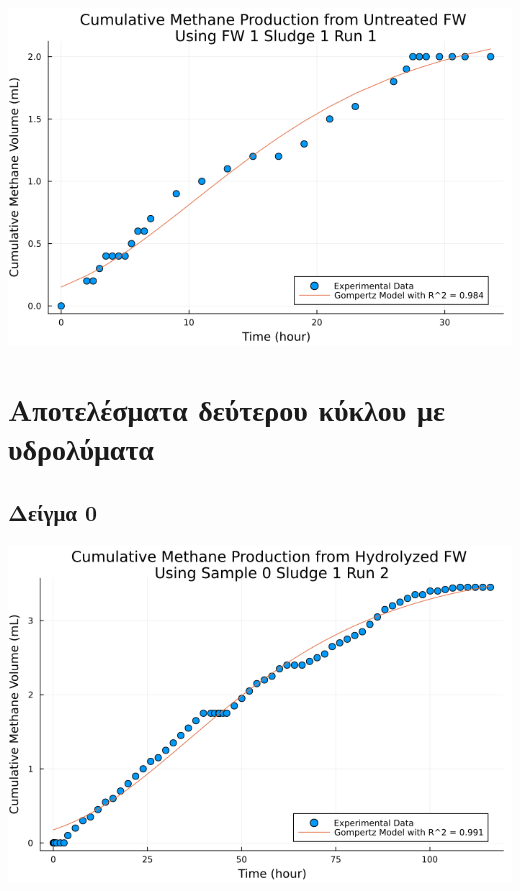 \documentclass[11pt]{article}
\begin{document}
\begin{center}
\includegraphics[width=.9\linewidth]{../plots/BMPs/Untreated FW/methane_kinetics_untreated_fw_s1_r1_hour.png}
\end{center}

\section{Αποτελέσματα δεύτερου κύκλου με υδρολύματα}
\label{sec:org182f161}

\subsection{Δείγμα 0}
\label{sec:org67a9056}
\begin{center}
\includegraphics[width=.9\linewidth]{../plots/BMPs/Hydrolyzed FW/methane_kinetics_hydrolysate_0_s1_r2_hour.png}
\end{center}
\end{document}
